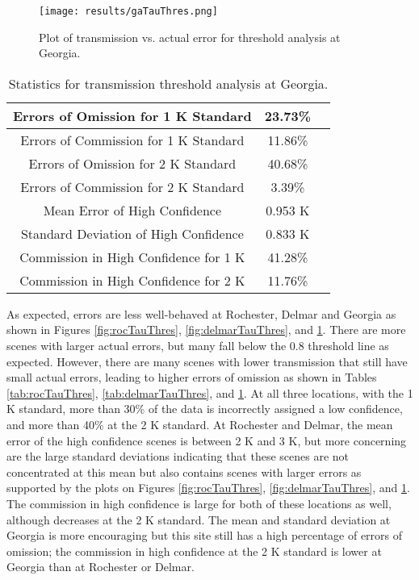 \documentclass{book}
\begin{document}
\begin{minipage}[c]{0.47\textwidth}
\centering
\begin{figure}[H]
\texttt{[image: results/gaTauThres.png]}
\caption{Plot of transmission vs. actual error for threshold analysis at Georgia.}
\label{fig:gaTauThres}
\end{figure}
\end{minipage}
\begin{minipage}[c]{0.47\textwidth}
\begin{table}[H]
\centering
\footnotesize
\begin{tabular}{ | c | c | c | } \hline
Errors of Omission for 1 K Standard & 23.73\% \\ \hline
Errors of Commission for 1 K Standard & 11.86\% \\ \hline
Errors of Omission for 2 K Standard & 40.68\% \\ \hline
Errors of Commission for 2 K Standard & 3.39\% \\ \hline
Mean Error of High Confidence & 0.953 K \\ \hline
Standard Deviation of High Confidence & 0.833 K \\ \hline
Commission in High Confidence for 1 K & 41.28\% \\ \hline
Commission in High Confidence for 2 K & 11.76\% \\ \hline
\end{tabular}
\caption{Statistics for transmission threshold analysis at Georgia.}
\label{tab:gaTauThres}
\end{table}
\end{minipage}

As expected, errors are less well-behaved at Rochester, Delmar and Georgia as shown in Figures \ref{fig:rocTauThres}, \ref{fig:delmarTauThres}, and \ref{fig:gaTauThres}.  There are more scenes with larger actual errors, but many fall below the 0.8 threshold line as expected.  However, there are many scenes with lower transmission that still have small actual errors, leading to higher errors of omission as shown in Tables \ref{tab:rocTauThres}, \ref{tab:delmarTauThres}, and \ref{tab:gaTauThres}.  At all three locations, with the 1 K standard, more than 30\% of the data is incorrectly assigned a low confidence, and more than 40\% at the 2 K standard.  At Rochester and Delmar, the mean error of the high confidence scenes is between 2 K and 3 K, but more concerning are the large standard deviations indicating that these scenes are not concentrated at this mean but also contains scenes with larger errors as supported by the plots on Figures \ref{fig:rocTauThres}, \ref{fig:delmarTauThres}, and \ref{fig:gaTauThres}.  The commission in high confidence is large for both of these locations as well, although decreases at the 2 K standard.  The mean and standard deviation at Georgia is more encouraging but this site still has a high percentage of errors of omission; the commission in high confidence at the 2 K standard is lower at Georgia than at Rochester or Delmar.
\end{document}

